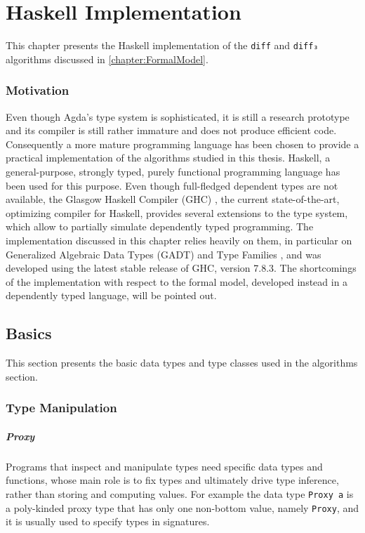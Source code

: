 \documentclass[../Thesis.tex]{subfiles}
\begin{document}
\chapter{Haskell Implementation}
This chapter presents the Haskell implementation of the \texttt{diff}
and \texttt{diff₃} algorithms discussed in \ref{chapter:FormalModel}.

	\subsection*{Motivation}
	Even though Agda's type system is sophisticated, it is still a research 
	prototype and its compiler is still rather immature and does not produce
	efficient code. Consequently a more mature programming language has 
	been chosen to provide a practical implementation of
	the algorithms studied in this thesis.
	Haskell, a general-purpose, strongly typed, purely functional 
	programming language \cite{Hudak07ahistory, Marlow_haskell2010} 
	has been used for this purpose.
	Even though full-fledged dependent types are not available, the 
	Glasgow Haskell Compiler (GHC) \cite{GHC}, the current state-of-the-art, 
	optimizing compiler for Haskell, provides several extensions to the type
	system, which allow to partially simulate dependently typed programming.
	The implementation discussed in this chapter 
	relies heavily on them, in particular on Generalized Algebraic Data Types 
	(GADT) \cite{JonWasWei04,PeytonJonesSUT,SchGADT} and Type Families
	\cite{ChakATC,ChakATS,SchrTCO,SchrTOT,Kiselyov09funwith}, and was
	developed using the latest stable release of GHC, version 7.8.3.
	The shortcomings of the implementation with respect
	to the formal model, developed instead in a dependently typed language, 
	will be pointed out.
	
	\section{Basics}
	This section presents the basic data types and type classes used 
	in the algorithms section.

	\subsection{Type Manipulation}

	\paragraph{Proxy}
	Programs that inspect and manipulate types need specific data types
	and functions, whose main role is to fix types and 
	ultimately drive type inference, rather than storing and computing values.
	For example the data type \texttt{Proxy a} is a poly-kinded proxy type that 
	has only one non-bottom value, namely \texttt{Proxy}, and it
	is usually used to specify types in signatures.
	
\end{document}
